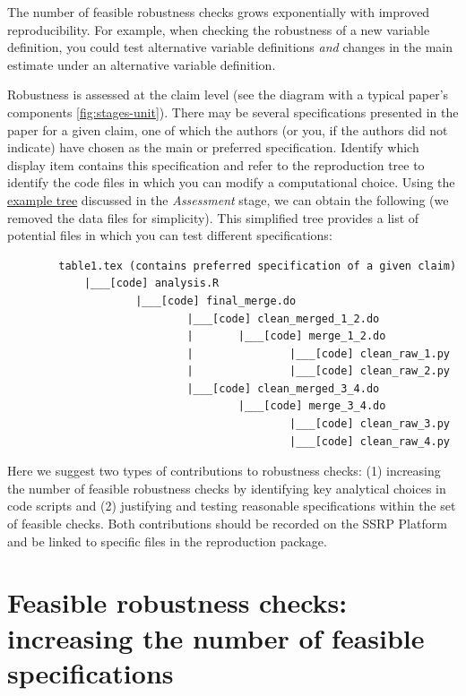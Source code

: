 \documentclass[
]{book}
\begin{document}
The number of feasible robustness checks grows exponentially with improved reproducibility. For example, when checking the robustness of a new variable definition, you could test alternative variable definitions \emph{and} changes in the main estimate under an alternative variable definition.

Robustness is assessed at the claim level (see the diagram with a typical paper's components \ref{fig:stages-unit}). There may be several specifications presented in the paper for a given claim, one of which the authors (or you, if the authors did not indicate) have chosen as the main or preferred specification. Identify which display item contains this specification and refer to the reproduction tree to identify the code files in which you can modify a computational choice. Using the \protect\hyperlink{complete-tree}{example tree} discussed in the \emph{Assessment} stage, we can obtain the following (we removed the data files for simplicity). This simplified tree provides a list of potential files in which you can test different specifications:

\begin{verbatim}
        table1.tex (contains preferred specification of a given claim)
            |___[code] analysis.R
                    |___[code] final_merge.do
                            |___[code] clean_merged_1_2.do
                            |       |___[code] merge_1_2.do
                            |               |___[code] clean_raw_1.py
                            |               |___[code] clean_raw_2.py
                            |___[code] clean_merged_3_4.do
                                    |___[code] merge_3_4.do
                                            |___[code] clean_raw_3.py
                                            |___[code] clean_raw_4.py
\end{verbatim}

Here we suggest two types of contributions to robustness checks: (1) increasing the number of feasible robustness checks by identifying key analytical choices in code scripts and (2) justifying and testing reasonable specifications within the set of feasible checks. Both contributions should be recorded on the SSRP Platform and be linked to specific files in the reproduction package.

\hypertarget{feasible-robustness-checks-increasing-the-number-of-feasible-specifications}{%
\section{Feasible robustness checks: increasing the number of feasible specifications}\label{feasible-robustness-checks-increasing-the-number-of-feasible-specifications}}
\end{document}
